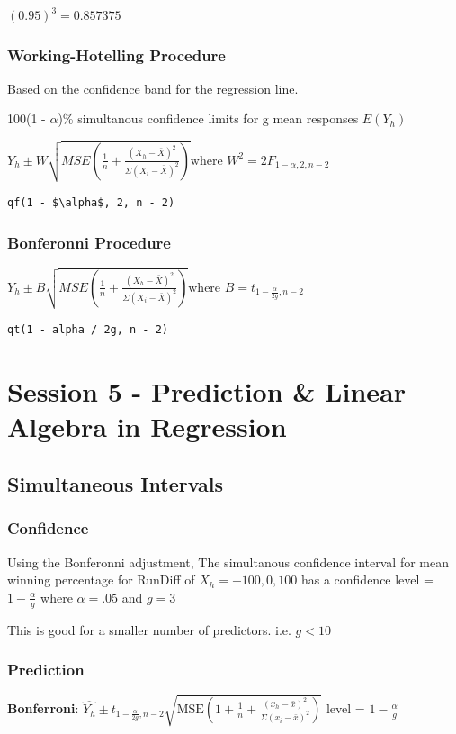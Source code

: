 \documentclass[11pt]{article}
\begin{document}
\((0.95)^3 = 0.857375\)

\subsubsection{Working-Hotelling Procedure}
\label{sec:org128482e}
Based on the confidence band for the regression line.

100(1 - \(\alpha\))\% simultanous confidence limits for g mean responses \(E(Y_h)\)

\(Y_h \pm W \sqrt{MSE(\frac{1}{n} +\frac{(X_h - \bar{X})^2}{\Sigma(X_i - \bar{X})^2})} \text{where } W^2 = 2 F_{1- \alpha, 2, n - 2}\)

\begin{verbatim}
qf(1 - $\alpha$, 2, n - 2)
\end{verbatim}

\subsubsection{Bonferonni Procedure}
\label{sec:org03325bb}

\(Y_h \pm B \sqrt{MSE(\frac{1}{n} + \frac{(X_h - \bar{X})^2}{\Sigma(X_i - \bar{X})^2}
)} \text{where } B = t_{1 -\frac{\alpha}{2g}, n - 2}\)

\begin{verbatim}
qt(1 - alpha / 2g, n - 2)
\end{verbatim}
\section{Session 5 - Prediction \& Linear Algebra in Regression}
\label{sec:org42ab00b}
\subsection{Simultaneous Intervals}
\label{sec:org517068e}
\subsubsection{Confidence}
\label{sec:orgc7125a6}
Using the Bonferonni adjustment, The simultanous confidence interval for mean winning percentage for RunDiff of
\(X_h = -100,0,100\) has a confidence level = \(1 - \frac{\alpha}{g}\) where \(\alpha
= .05\) and \(g = 3\)

This is good for a smaller number of predictors. i.e. \(g < 10\)
\subsubsection{Prediction}
\label{sec:org0c9d8bb}
\textbf{Bonferroni}: \(\hat{Y_h} \pm t_{1 -\frac{\alpha}{2g}, n-2}
\sqrt{\text{MSE}(1 + \frac{1}{n} +\frac{(x_h - \bar{x})^2}{\Sigma(x_i - \bar{x})^2})}\)
level = \(1 - \frac{\alpha}{g}\)
\end{document}
